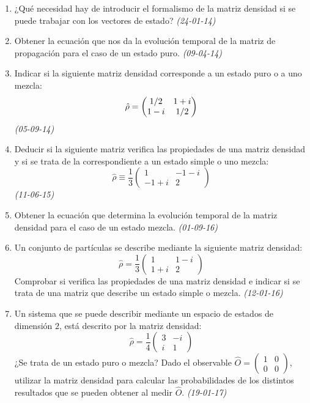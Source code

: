 \begin{enumerate}
    
    \item ¿Qué necesidad hay de introducir el formalismo de la matriz densidad si se puede trabajar con los vectores de estado? \textit{(24-01-14)}
    
    \item Obtener la ecuación que nos da la evolución temporal de la matriz de propagación para el caso de un estado puro. \textit{(09-04-14)}
    
    \item Indicar si la siguiente matriz densidad corresponde a un estado puro o a uno mezcla: $$\hat{\rho} = \pmqty{ 1/2 & 1 + i \\ 1 - i & 1/2 }$$ \textit{(05-09-14)}

    \item Deducir si la siguiente matriz verifica las propiedades de una matriz densidad y si se trata de la correspondiente a un estado simple o uno mezcla:
    \[
    \hat{\rho} \equiv \frac{1}{3} \begin{pmatrix} 1 & -1 - i \\ -1 + i & 2 \end{pmatrix}
    \] \textit{(11-06-15)}

    \item Obtener la ecuación que determina la evolución temporal de la matriz densidad para el caso de un estado mezcla. \textit{(01-09-16)}

    \item Un conjunto de partículas se describe mediante la siguiente matriz densidad:
    \[
    \hat{\rho} = \frac{1}{3} \begin{pmatrix} 1 & 1 - i \\ 1 + i & 2 \end{pmatrix}
    \]
    Comprobar si verifica las propiedades de una matriz densidad e indicar si se trata de una matriz que describe un estado simple o mezcla. \textit{(12-01-16)}

    \item Un sistema que se puede describir mediante un espacio de estados de dimensión $2$, está descrito por la matriz densidad:
    \[
    \hat{\rho} = \frac{1}{4} \begin{pmatrix} 3 & -i \\ i & 1 \end{pmatrix}
    \]
    ¿Se trata de un estado puro o mezcla? Dado el observable $\hat{O} = \begin{pmatrix} 1 & 0 \\ 0 & 0 \end{pmatrix}$, utilizar la matriz densidad para calcular las probabilidades de los distintos resultados que se pueden obtener al medir $\hat{O}$. \textit{(19-01-17)}
    

\end{enumerate}
